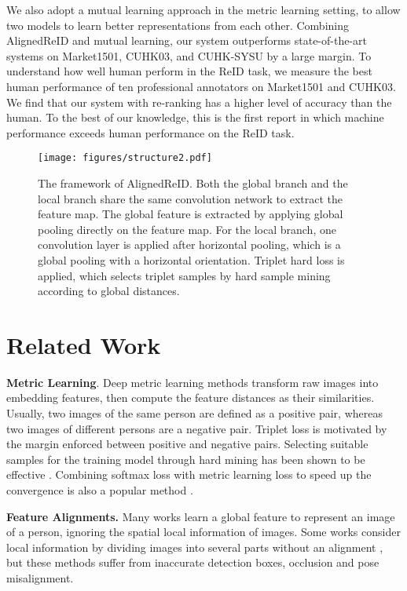 \documentclass[10pt,twocolumn,letterpaper]{article}
\begin{document}
We also adopt a mutual learning approach \cite{zhang2017deep} in the metric learning setting, to allow two models to learn better representations from each other.
Combining AlignedReID and mutual learning, our system outperforms state-of-the-art systems on Market1501, CUHK03, and CUHK-SYSU by a large margin.
To understand how well human perform in the ReID task, we measure the best human performance of ten professional annotators on Market1501 and CUHK03.
We find that our system with re-ranking \cite{zhong2017re} has a higher level of accuracy than the human.
To the best of our knowledge, this is the first report in which machine performance exceeds human performance on the ReID task.





\begin{figure*}[htb]
\centering
\texttt{[image: figures/structure2.pdf]}
\caption{The framework of AlignedReID.
Both the global branch and the local branch share the same convolution network to extract the feature map.
The global feature is extracted by applying global pooling directly on the feature map.
For the local branch, one  convolution layer is applied after horizontal pooling, which is a global pooling with a horizontal orientation.
Triplet hard loss is applied, which selects triplet samples by hard sample mining according to global distances.}
\label{fig:Structure}
\end{figure*}

\section{Related Work}
\label{relatedwork}

\noindent \textbf{Metric Learning}.
Deep metric learning methods transform raw images into embedding features, then compute the feature distances as their similarities. Usually, two images of the same person are defined as a positive pair, whereas two images of different persons are a negative pair.
Triplet loss \cite{liu2017end} is motivated by the margin enforced between positive and negative pairs.
Selecting suitable samples for the training model through hard mining has been shown to be effective \cite{hermans2017defense, chen2017beyond, xiao2017margin}.
Combining softmax loss with metric learning loss to speed up the convergence is also a popular method \cite{geng2016deep}. 

\noindent \textbf{Feature Alignments.}
Many works learn a global feature to represent an image of a person, ignoring the spatial local information of images.
Some works consider local information by dividing images into several parts without an alignment \cite{varior2016siamese, xiao2016cross, yao2017deep},
but these methods suffer from inaccurate detection boxes, occlusion and pose misalignment.
\end{document}
